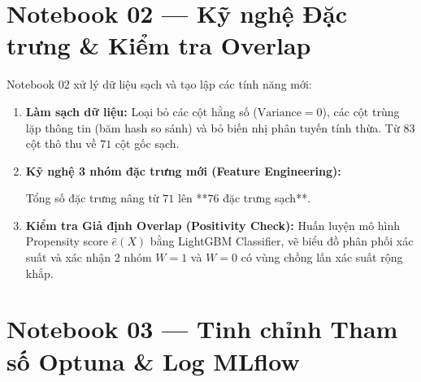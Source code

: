 \section{Notebook 02 — Kỹ nghệ Đặc trưng \& Kiểm tra Overlap}

Notebook 02 xử lý dữ liệu sạch và tạo lập các tính năng mới:
\begin{enumerate}[leftmargin=*]
    \item \textbf{Làm sạch dữ liệu:} Loại bỏ các cột hằng số ($\text{Variance} = 0$), các cột trùng lặp thông tin (băm hash so sánh) và bỏ biến nhị phân tuyến tính thừa. Từ $83$ cột thô thu về $71$ cột gốc sạch.
    \item \textbf{Kỹ nghệ 3 nhóm đặc trưng mới (Feature Engineering):}
    Tổng số đặc trưng nâng từ $71$ lên **$76$ đặc trưng sạch**.
    \item \textbf{Kiểm tra Giả định Overlap (Positivity Check):} Huấn luyện mô hình Propensity score $\hat{e}(X)$ bằng LightGBM Classifier, vẽ biểu đồ phân phối xác suất và xác nhận 2 nhóm $W=1$ và $W=0$ có vùng chồng lấn xác suất rộng khắp.
\end{enumerate}

\section{Notebook 03 — Tinh chỉnh Tham số Optuna \& Log MLflow}


